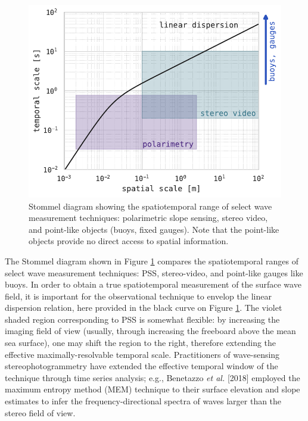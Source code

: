 \documentclass[letterpaper,journal]{IEEEtran}
\begin{document}
\begin{figure}[!ht]
    \centering
    \includegraphics[width=\linewidth]{_figures/wave_measurement_stommel_diagram.pdf}
    \caption{Stommel diagram showing the spatiotemporal range of select wave measurement techniques: polarimetric slope sensing, stereo video, and point-like objects (buoys, fixed gauges). Note that the point-like objects provide no direct access to spatial information.}
    \label{fig:wave_measurement_stommel_diagram}
\end{figure}

The Stommel diagram shown in Figure \ref{fig:wave_measurement_stommel_diagram} compares the spatiotemporal ranges of select wave measurement techniques: PSS, stereo-video, and point-like gauges like buoys. In order to obtain a true spatiotemporal measurement of the surface wave field, it is important for the observational technique to envelop the linear dispersion relation, here provided in the black curve on Figure \ref{fig:wave_measurement_stommel_diagram}. The violet shaded region corresponding to PSS is somewhat flexible: by increasing the imaging field of view (usually, through increasing the freeboard above the mean sea surface), one may shift the region to the right, therefore extending the effective maximally-resolvable temporal scale. Practitioners of wave-sensing stereophotogrammetry have extended the effective temporal window of the technique through time series analysis; e.g., Benetazzo \emph{et al.} [2018] \cite{Benetazzo2018} employed the maximum entropy method (MEM) technique \cite{lygre_maximum_1986} to their surface elevation and slope estimates to infer the frequency-directional spectra of waves larger than the stereo field of view. 
\end{document}
